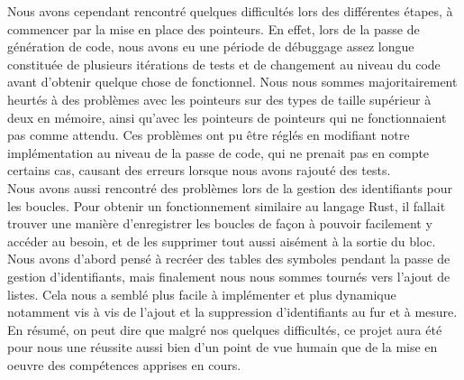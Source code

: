 \documentclass{article}
\begin{document}
Nous avons cependant rencontré quelques difficultés lors des différentes étapes, à commencer par la mise en place des pointeurs. En effet, lors de la passe de génération de code, nous avons eu une période de débuggage assez longue constituée de plusieurs itérations de tests et de changement au niveau du code avant d'obtenir quelque chose de fonctionnel. Nous nous sommes majoritairement heurtés à des problèmes avec les pointeurs sur des types de taille supérieur à deux en mémoire, ainsi qu'avec les pointeurs de pointeurs qui ne fonctionnaient pas comme attendu. Ces problèmes ont pu être réglés en modifiant notre implémentation au niveau de la passe de code, qui ne prenait pas en compte certains cas, causant des erreurs lorsque nous avons rajouté des tests.\\

Nous avons aussi rencontré des problèmes lors de la gestion des identifiants pour les boucles. Pour obtenir un fonctionnement similaire au langage Rust, il fallait trouver une manière d'enregistrer les boucles de façon à pouvoir facilement y accéder au besoin, et de les supprimer tout aussi aisément à la sortie du bloc. Nous avons d'abord pensé à recréer des tables des symboles pendant la passe de gestion d'identifiants, mais finalement nous nous sommes tournés vers l'ajout de listes. Cela nous a semblé plus facile à implémenter et plus dynamique notamment vis à vis de l'ajout et la suppression d'identifiants au fur et à mesure.\\

En résumé, on peut dire que malgré nos quelques difficultés, ce projet aura été pour nous une réussite aussi bien d'un point de vue humain que de la mise en oeuvre des compétences apprises en cours.
\end{document}
